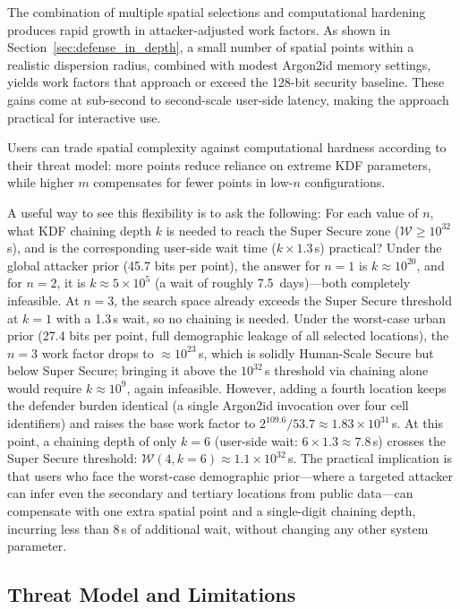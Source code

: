 \documentclass[mathematics,article,accept,pdftex,moreauthors]{Definitions/mdpi}
\begin{document}
The combination of multiple spatial selections and computational hardening produces rapid growth in attacker-adjusted work factors. As shown in Section~\ref{sec:defense_in_depth}, a small number of spatial points within a realistic dispersion radius, combined with modest Argon2id memory settings, yields work factors that approach or exceed the 128-bit security baseline. These gains come at sub-second to second-scale user-side latency, making the approach practical for interactive use.

Users can trade spatial complexity against computational hardness according to their threat model: more points reduce reliance on extreme KDF parameters, while higher $m$ compensates for fewer points in low-$n$ configurations.

{A useful way to see this flexibility is to ask the following: For each value of $n$, what KDF chaining depth $k$ is needed to reach the Super Secure zone ($\mathcal{W} \geq 10^{32}$\,s), and is the corresponding user-side wait time ($k \times 1.3$\,s) practical? Under the global attacker prior (45.7 bits per point), the answer for $n=1$ is $k \approx 10^{20}$, and for $n=2$, it is $k \approx 5 \times 10^5$ (a wait of roughly 7.5~days)---both completely infeasible. At $n=3$, the search space already exceeds the Super Secure threshold at $k=1$ with a 1.3\,s wait, so no chaining is needed. Under the worst-case urban prior (27.4 bits per point, full demographic leakage of all selected locations), the $n=3$ work factor drops to $\approx\!10^{23}$\,s, which is solidly Human-Scale Secure but below Super Secure; bringing it above the $10^{32}$\,s threshold via chaining alone would require $k \approx 10^9$, again infeasible. However, adding a fourth location keeps the defender burden identical (a single Argon2id invocation over four cell identifiers) and raises the base work factor to $2^{109.6}/53.7 \approx 1.83 \times 10^{31}$\,s. At this point, a chaining depth of only $k=6$ (user-side wait: $6 \times 1.3 \approx 7.8$\,s) crosses the Super Secure threshold: $\mathcal{W}(4, k=6) \approx 1.1 \times 10^{32}$\,s. The practical implication is that users who face the worst-case demographic prior---where a targeted attacker can infer even the secondary and tertiary locations from public data---can compensate with one extra spatial point and a single-digit chaining depth, incurring less than 8\,s of additional wait, without changing any other system parameter.}

\subsection{Threat Model and Limitations}
\end{document}
